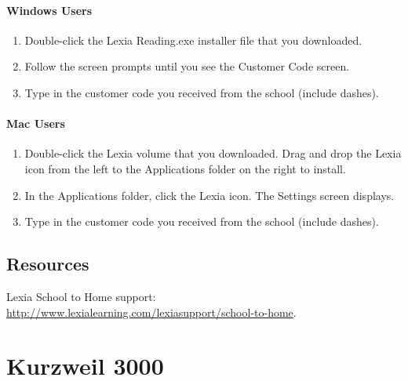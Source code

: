\documentclass[letterpaper,10pt,english]{sphinxmanual}
\begin{document}
\subsubsection{Windows Users}
\label{lexia:windows-users}\begin{enumerate}
\item {} 
Double-click the Lexia Reading.exe installer file that you downloaded.

\item {} 
Follow the screen prompts until you see the Customer Code screen.

\item {} 
Type in the customer code you received from the school (include dashes).

\end{enumerate}


\subsubsection{Mac Users}
\label{lexia:mac-users}\begin{enumerate}
\item {} 
Double-click the Lexia volume that you downloaded. Drag and drop the Lexia icon from the left to the Applications folder on the right to install.

\item {} 
In the Applications folder, click the Lexia icon. The Settings screen displays.

\item {} 
Type in the customer code you received from the school (include dashes).

\end{enumerate}


\section{Resources}
\label{lexia:resources}
Lexia School to Home support: \href{http://www.lexialearning.com/lexiasupport/school-to-home}{http://www.lexialearning.com/lexiasupport/school-to-home}.


\chapter{Kurzweil 3000}
\label{kurzweil::doc}\label{kurzweil:index-0}\label{kurzweil:kurzweil-3000}
\end{document}
